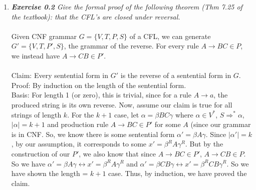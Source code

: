 \documentclass[a4paper]{article}
\begin{document}
\begin{enumerate}
\item \emph{\textbf{Exercise 0.2} Give the formal proof of the following theorem (Thm 7.25 of the textbook): that the CFL's are closed under reversal.} \\
\\
Given CNF grammar $G = \{V, T, P, S\}$ of a CFL, we can generate $G' = \{V, T, P', S\}$, the grammar of the reverse. For every rule $A \to BC \in P$, we instead have $A \to CB \in P'$. \\
\\
Claim: Every sentential form in $G'$ is the reverse of a sentential form in $G$. \\
Proof: By induction on the length of the sentential form. \\
Basis: For length 1 (or zero), this is trivial, since for a rule $A \to a$, the produced string is its own reverse. Now, assume our claim is true for all strings of length $k$. For the $k+1$ case, let $\alpha = \beta BC \gamma$ where $\alpha \in V^\ast$, $S \Rightarrow^\ast \alpha$, $|\alpha| = k+1$ and production rule $A \to BC \in P'$ for some $A$ (since our grammar is in CNF. So, we know there is some sentential form $\alpha' = \beta A \gamma$. Since $|\alpha'| = k$, by our assumption, it corresponds to some $x' = \beta^R A \gamma^R$. But by the construction of our $P'$, we also know that since $A\to BC \in P'$, $A\to CB \in P$. So we have 
$\alpha' = \beta A \gamma \leftrightarrow x' = \beta^R A \gamma^R$ and $\alpha' = \beta CB \gamma \leftrightarrow x' = \beta^R CB \gamma^R$. So we have shown the length = $k+1$ case. Thus, by induction, we have proved the claim. \\




\end{enumerate}
\end{document}
